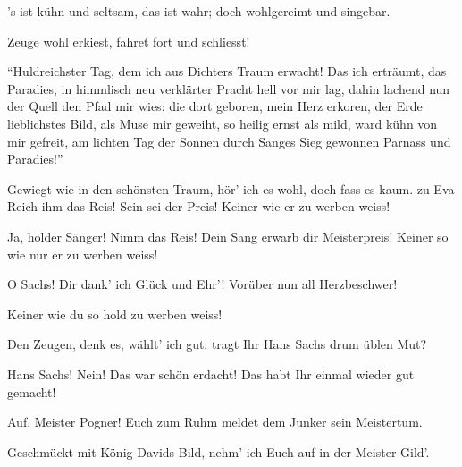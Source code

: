 \begin{drama}
's ist kühn und seltsam, das ist wahr;
doch wohlgereimt und singebar.

\Sachsspeaks
Zeuge wohl erkiest, fahret fort und schliesst!

\Waltherspeaks
{}
``Huldreichster Tag,
dem ich aus Dichters Traum erwacht!
Das ich erträumt, das Paradies,
in himmlisch neu verklärter Pracht
hell vor mir lag,
dahin lachend nun der Quell den Pfad mir wies:
die dort geboren, mein Herz erkoren,
der Erde lieblichstes Bild,
als Muse mir geweiht,
so heilig ernst als mild,
ward kühn von mir gefreit,
am lichten Tag der Sonnen
durch Sanges Sieg gewonnen
Parnass und Paradies!''

Gewiegt wie in den schönsten Traum,
hör' ich es wohl, doch fass es kaum.
zu Eva
Reich ihm das Reis! Sein sei der Preis!
Keiner wie er zu werben weiss!


Ja, holder Sänger!
Nimm das Reis!
Dein Sang erwarb dir Meisterpreis!
Keiner so wie nur er zu werben weiss!

\Pognerspeaks
{}

O Sachs! Dir dank' ich Glück und Ehr'!
Vorüber nun all Herzbeschwer!


\Evaspeaks
{}

Keiner wie du so hold zu werben weiss!

\Sachsspeaks
{}

Den Zeugen, denk es, wählt' ich gut:
tragt Ihr Hans Sachs drum üblen Mut?


Hans Sachs! Nein! Das war schön erdacht!
Das habt Ihr einmal wieder gut gemacht!


Auf, Meister Pogner! Euch zum Ruhm
meldet dem Junker sein Meistertum.

\Pognerspeaks
{}

Geschmückt mit König Davids Bild,
nehm' ich Euch auf in der Meister Gild'.


\end{drama}
